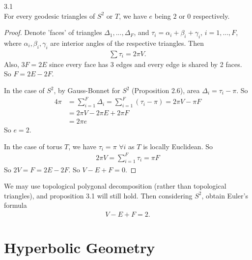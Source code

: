 \documentclass[a4paper]{article}
\begin{document}
\begin{prop} 3.1\\
For every geodesic triangles of $S^2$ or $T$, we have $e$ being $2$ or $0$ respectively.
\begin{proof}
Denote 'faces' of triangles $\Delta_1,...,\Delta_F$, and $\tau_i = \alpha_i + \beta_i + \gamma_i$, $i=1,...,F$, where $\alpha_i,\beta_i,\gamma_i$ are interior angles of the respective triangles. Then
\begin{equation*}
\begin{aligned}
\sum \tau_i = 2\pi V.
\end{aligned}
\end{equation*}
Also, $3F = 2E$ since every face has 3 edges and every edge is shared by 2 faces. So $F=2E-2F$.

In the case of $S^2$, by Gauss-Bonnet for $S^2$ (Proposition 2.6), area $\Delta_i = \tau_i - \pi$. So
\begin{equation*}
\begin{aligned}
4\pi &= \sum_{i=1}^F \Delta_i = \sum_{i=1}^F (\tau_i-\pi) = 2\pi V - \pi F\\
&= 2\pi V - 2\pi E + 2\pi F\\
&= 2\pi e
\end{aligned}
\end{equation*}
So $e=2$.

In the case of torus $T$, we have $\tau_i = \pi$ $\forall i$ as $T$ is locally Euclidean. So
\begin{equation*}
\begin{aligned}
2\pi V = \sum_{i=1}^F \tau_i = \pi F
\end{aligned}
\end{equation*}
So $2V=F = 2E-2F$. So $V-E+F=0$.
\end{proof}
\end{prop}

\begin{rem}
We may use topological polygonal decomposition (rather than topological triangles), and proposition 3.1 will still hold. Then considering $S^2$, obtain Euler's formula
\begin{equation*}
\begin{aligned}
V-E+F=2.
\end{aligned}
\end{equation*}
\end{rem}

\newpage

\section{Hyperbolic Geometry}
\end{document}
